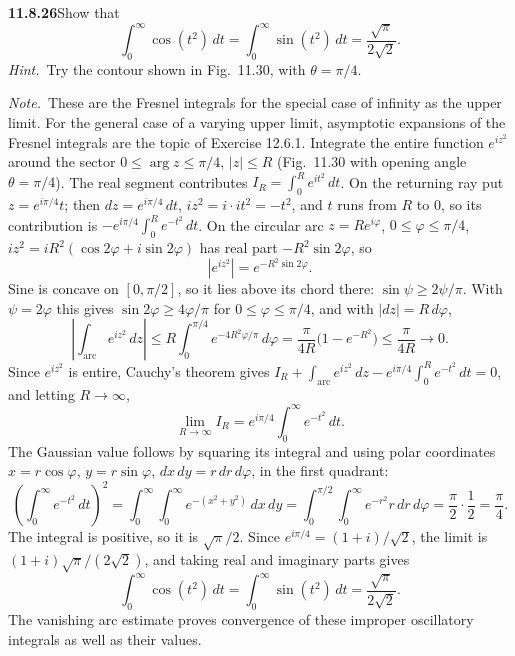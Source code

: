 \par\bigskip
\noindent\textbf{11.8.26}\quad Show that
\[
\int_{0}^{\infty}\cos(t^{2})\,dt
=\int_{0}^{\infty}\sin(t^{2})\,dt
=\frac{\sqrt{\pi}}{2\sqrt{2}}.
\]
\emph{Hint.}~Try the contour shown in Fig.~11.30, with $\theta=\pi/4$.

\emph{Note.}~These are the Fresnel integrals for the special case of infinity
as the upper limit. For the general case of a varying upper limit, asymptotic
expansions of the Fresnel integrals are the topic of Exercise 12.6.1.
\solution
Integrate the entire function $e^{iz^2}$ around the sector
$0\le\arg z\le\pi/4$, $|z|\le R$ (Fig.~11.30 with opening angle
$\theta=\pi/4$). The real segment contributes
$I_R=\int_0^R e^{it^2}\,dt$. On the returning ray put
$z=e^{i\pi/4}t$; then $dz=e^{i\pi/4}\,dt$, $iz^2=i\cdot it^2=-t^2$,
and $t$ runs from $R$ to $0$, so its contribution is
$-e^{i\pi/4}\int_0^R e^{-t^2}\,dt$.
On the circular arc $z=Re^{i\varphi}$, $0\le\varphi\le\pi/4$,
$iz^2=iR^2(\cos2\varphi+i\sin2\varphi)$ has real part
$-R^2\sin2\varphi$, so
\[
|e^{iz^2}|=e^{-R^2\sin2\varphi}.
\]
Sine is concave on $[0,\pi/2]$, so it lies above its chord there:
$\sin\psi\ge2\psi/\pi$. With $\psi=2\varphi$ this gives
$\sin2\varphi\ge4\varphi/\pi$ for $0\le\varphi\le\pi/4$, and with
$|dz|=R\,d\varphi$,
\[
\left|\int_{\text{arc}}e^{iz^2}\,dz\right|
\le R\int_0^{\pi/4}e^{-4R^2\varphi/\pi}\,d\varphi
=\frac{\pi}{4R}\bigl(1-e^{-R^2}\bigr)
\le\frac{\pi}{4R}\longrightarrow0.
\]
Since $e^{iz^2}$ is entire, Cauchy's theorem gives
$I_R+\int_{\text{arc}}e^{iz^2}\,dz-e^{i\pi/4}\int_0^Re^{-t^2}\,dt=0$,
and letting $R\to\infty$,
\[
\lim_{R\to\infty} I_R
=e^{i\pi/4}\int_0^\infty e^{-t^2}\,dt.
\]
The Gaussian value follows by squaring its integral
and using polar coordinates $x=r\cos\varphi$, $y=r\sin\varphi$,
$dx\,dy=r\,dr\,d\varphi$, in the first quadrant:
\[
\left(\int_0^\infty e^{-t^2}\,dt\right)^2
=\int_0^\infty\!\!\int_0^\infty e^{-(x^2+y^2)}\,dx\,dy
=\int_0^{\pi/2}\int_0^\infty e^{-r^2}r\,dr\,d\varphi
=\frac{\pi}{2}\cdot\frac12=\frac{\pi}{4}.
\]
The integral is positive, so it is $\sqrt\pi/2$.
Since $e^{i\pi/4}=(1+i)/\sqrt2$, the limit is
$(1+i)\sqrt\pi/(2\sqrt2)$, and taking real and imaginary parts gives
\[
\boxed{\int_0^\infty\cos(t^2)\,dt
=\int_0^\infty\sin(t^2)\,dt=\frac{\sqrt\pi}{2\sqrt2}}.
\]
The vanishing arc estimate proves convergence of these improper
oscillatory integrals as well as their values.

